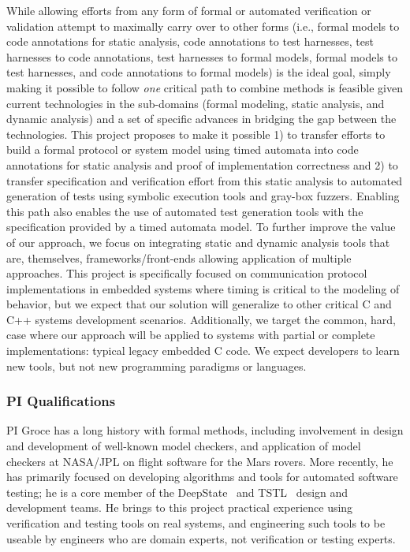 While allowing efforts from any form of formal or automated verification or validation attempt to maximally carry over to other forms (i.e., formal models to code annotations for static analysis, code annotations to test harnesses, test harnesses to code annotations, test harnesses to formal models, formal models to test harnesses, and code annotations to formal models) is the ideal goal, simply making it possible to follow \emph{one} critical path to combine methods is feasible given current technologies in the sub-domains (formal modeling, static analysis, and dynamic analysis) and a set of specific advances in bridging the gap between the technologies.  This project proposes to make it possible 1) to transfer efforts to build a formal protocol or system model using timed automata into code annotations for static analysis and proof of implementation correctness and 2) to transfer specification and verification effort from this static analysis to automated generation of tests using symbolic execution tools and gray-box fuzzers.  Enabling this path also enables the use of automated test generation tools with the specification provided by a timed automata model.  To further improve the value of our approach, we focus on integrating static and dynamic analysis tools that are, themselves, frameworks/front-ends allowing application of multiple approaches.  This project is specifically focused on communication protocol implementations in embedded systems where timing is critical to the modeling of behavior, but we expect that our solution will generalize to other critical C and C++ systems development scenarios.  Additionally, we target the common, hard, case where our approach will be applied to systems with partial or complete implementations: typical legacy embedded C code.  We expect developers to learn new tools, but not new programming paradigms or languages.

\subsubsection{PI Qualifications}

PI Groce has a long history with formal methods, including involvement in design and development of well-known model checkers, and application of model checkers at NASA/JPL on flight software for the Mars rovers.  More recently, he has primarily focused on developing algorithms and tools for automated software testing; he is a core member of the DeepState~\cite{DeepState,deepstatetutorial,deepstaterepo} and TSTL~\cite{tstlsttt} design and development teams.  He brings to this project practical experience using verification and testing tools on real systems, and engineering such tools to be useable by engineers who are domain experts, not verification or testing experts.

